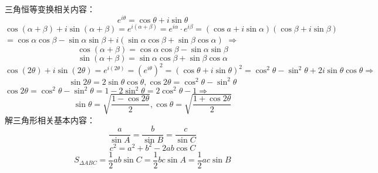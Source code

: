 三角恒等变换相关内容：
\begin{equation}
{e^{i\theta }} = \cos \theta  + i\sin \theta 
\end{equation}
$
\cos \left( {\alpha  + \beta } \right) + i\sin \left( {\alpha  + \beta } \right) = {e^{i\left( {\alpha  + \beta } \right)}} = {e^{i\alpha }} \cdot {e^{i\beta }} = \left( {\cos a + i\sin \alpha } \right)\left( {\cos \beta  + i\sin \beta } \right)
$
$= \cos \alpha \cos \beta  - \sin \alpha \sin \beta  + i\left( {\sin \alpha \cos \beta  + \sin \beta \cos \alpha } \right)
$
$\Rightarrow$
\begin{equation}
\cos \left( {\alpha  + \beta } \right) = \cos \alpha \cos \beta  - \sin \alpha \sin \beta
\end{equation}
\begin{equation}
\sin \left( {\alpha  + \beta } \right) = \sin \alpha \cos \beta  + \sin \beta \cos \alpha
\end{equation}
$
\cos \left( {2\theta } \right) + i\sin \left( {2\theta } \right) = {e^{i\left( {2\theta } \right)}} = {\left( {{e^{i\theta }}} \right)^2} = {\left( {\cos \theta  + i\sin \theta } \right)^2} = {\cos ^2}\theta  - {\sin ^2}\theta  + 2i\sin \theta \cos \theta \Rightarrow
$
\begin{equation}
\sin 2\theta  = 2\sin \theta \cos \theta ,\cos 2\theta  = {\cos ^2}\theta  - {\sin ^2}\theta
\end{equation}
$\cos 2\theta  = {\cos ^2}\theta  - {\sin ^2}\theta  = 1 - 2{\sin ^2}\theta  = 2{\cos ^2}\theta  - 1\Rightarrow$
\begin{equation}
\sin \theta  = \sqrt {\frac{{1 - \cos 2\theta }}{2}} ,\cos \theta  = \sqrt {\frac{{1 + \cos 2\theta }}{2}}
\end{equation}
解三角形相关基本内容：
\begin{equation}
\frac{a}{{\sin A}} = \frac{b}{{\sin B}} = \frac{c}{{\sin C}}
\end{equation}
\begin{equation}
{c^2} = {a^2} + {b^2} - 2ab\cos C
\end{equation}
\begin{equation}
{S_{\Delta ABC}} = \frac{1}{2}ab\sin C = \frac{1}{2}bc\sin A = \frac{1}{2}ac\sin B
\end{equation}